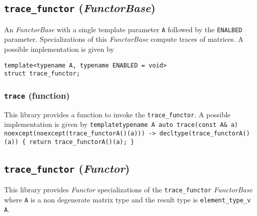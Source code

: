 \subsection{\texttt{trace\_functor} (\textit{FunctorBase})}
An \textit{FunctorBase} with a single template parameter \texttt{A} followed by the \texttt{ENALBED} parameter.
Specializations of this \textit{FunctorBase} compute traces of matrices.
A possible implementation is given by
\begin{verbatim}
template<typename A, typename ENABLED = void>
struct trace_functor;
\end{verbatim}

\subsubsection{\texttt{trace} (function)}
This library provides a function to invoke the \texttt{trace\_functor}.
A possible implementation is given by\newline
\texttt{template\textlangle typename A\textrangle\newline
auto\newline
trace(const A\& a)\newline
noexcept(noexcept(trace\_functor\textlangle A\textrangle()(a)))
-> decltype(trace\_functor\textlangle A\textrangle()(a))\newline
\{ return trace\_functor\textlangle A\textrangle()(a); \}}

\subsection{\texttt{trace\_functor} (\textit{Functor})}
This library provides \textit{Functor} specializations of the \texttt{trace\_functor} \textit{FunctorBase}
where \texttt{A} is a non degenerate matrix type and the result type is \texttt{element\_type\_v\textlangle
A\textrangle}.

